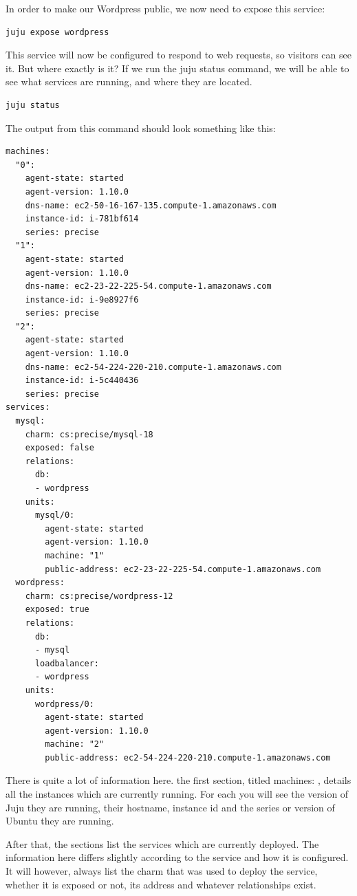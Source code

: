 \documentclass[letterpaper,10pt,english]{sphinxmanual}
\begin{document}
In order to make our Wordpress public, we now need to expose this
service:

\begin{Verbatim}[commandchars=\\\{\}]
juju expose wordpress
\end{Verbatim}

This service will now be configured to respond to web requests, so
visitors can see it. But where exactly is it? If we run the juju
status command, we will be able to see what services are running, and
where they are located.

\begin{Verbatim}[commandchars=\\\{\}]
juju status
\end{Verbatim}

The output from this command should look something like this:

\begin{Verbatim}[commandchars=\\\{\}]
machines:
  "0":
    agent-state: started
    agent-version: 1.10.0
    dns-name: ec2-50-16-167-135.compute-1.amazonaws.com
    instance-id: i-781bf614
    series: precise
  "1":
    agent-state: started
    agent-version: 1.10.0
    dns-name: ec2-23-22-225-54.compute-1.amazonaws.com
    instance-id: i-9e8927f6
    series: precise
  "2":
    agent-state: started
    agent-version: 1.10.0
    dns-name: ec2-54-224-220-210.compute-1.amazonaws.com
    instance-id: i-5c440436
    series: precise
services:
  mysql:
    charm: cs:precise/mysql-18
    exposed: false
    relations:
      db:
      - wordpress
    units:
      mysql/0:
        agent-state: started
        agent-version: 1.10.0
        machine: "1"
        public-address: ec2-23-22-225-54.compute-1.amazonaws.com
  wordpress:
    charm: cs:precise/wordpress-12
    exposed: true
    relations:
      db:
      - mysql
      loadbalancer:
      - wordpress
    units:
      wordpress/0:
        agent-state: started
        agent-version: 1.10.0
        machine: "2"
        public-address: ec2-54-224-220-210.compute-1.amazonaws.com
\end{Verbatim}

There is quite a lot of information here. the first section, titled
machines: , details all the instances which are currently running. For
each you will see the version of Juju they are running, their
hostname, instance id and the series or version of Ubuntu they are
running.

After that, the sections list the services which are currently
deployed. The information here differs slightly according to the
service and how it is configured. It will however, always list the
charm that was used to deploy the service, whether it is exposed or
not, its address and whatever relationships exist.
\end{document}
